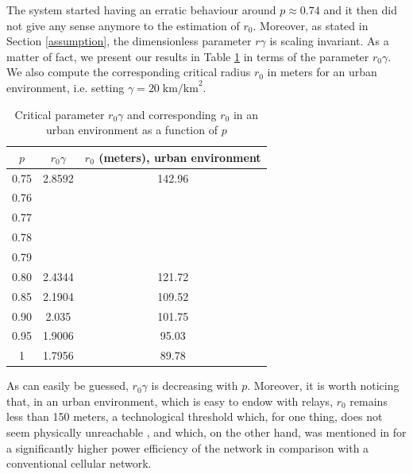 \documentclass[conference]{IEEEtran}
\begin{document}
\indent The system started having an erratic behaviour around $p \approx 0.74$ and it then did not give any sense anymore to the estimation of $r_{0}$. Moreover, as stated in Section \ref{assumption}, the dimensionless parameter $r\gamma$ is scaling invariant. As a matter of fact, we present our results in Table \ref{tab-rgamma0} in terms of the parameter $r_{0}\gamma$. We also compute the corresponding critical radius $r_{0}$ in meters for an urban environment, i.e. setting $\gamma = 20 \; \text{km/km}^{2}$.
\begin{table}[t!]
\caption{Critical parameter $r_{0}\gamma$ and corresponding $r_{0}$ in an urban environment as a function of $p$}
\begin{center}
\begin{tabular}{|c|c|c|}
\hline
$p$ & $r_{0}\gamma$ & $r_{0}$ (meters), urban environment \\
\hline
0.75 & 2.8592 & 142.96  \\
0.76 & &  \\
0.77 & &  \\
0.78 & &  \\
0.79 & &  \\
0.80 & 2.4344 & 121.72  \\
0.85 & 2.1904 & 109.52 \\
0.90 & 2.035 & 101.75 \\
0.95 & 1.9006  & 95.03 \\
1 & 1.7956 & 89.78  \\
\hline
\end{tabular}
\label{tab-rgamma0}
\end{center}
\end{table}
\newline \indent As can easily be guessed, $r_{0}\gamma$ is decreasing with $p$. Moreover, it is worth noticing that, in an urban environment, which is easy to endow with relays, $r_{0}$ remains less than 150 meters, a technological threshold which, for one thing, does not seem physically unreachable \cite{lin_comprehensive_2013}, and which, on the other hand, was mentioned in \cite{asadi_survey_2014} for a significantly higher power efficiency of the network in comparison with a conventional cellular network. \\
\end{document}
